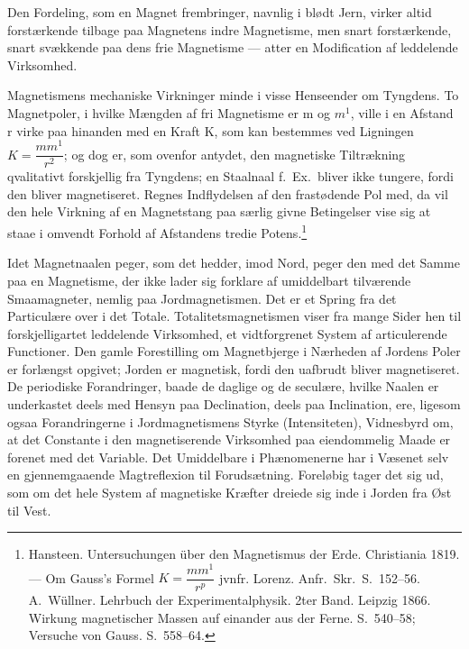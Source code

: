 \documentclass[12pt,a4paper]{book}
\begin{document}
Den Fordeling, som en Magnet frembringer, navnlig i blødt Jern, virker
altid forstærkende tilbage paa Magnetens indre Magnetisme, men snart
forstærkende, snart svækkende paa dens frie Magnetisme --- atter en
Modification af leddelende Virksomhed.

Magnetismens mechaniske Virkninger minde i visse Henseender om
Tyngdens. To Magnetpoler, i hvilke Mængden af fri Magnetisme er m og
$m^{1}$, ville i en Afstand r virke paa hinanden med en Kraft K, som
kan bestemmes ved Ligningen $K = \dfrac{mm^{1}}{r^{2}}$; og dog er,
som ovenfor antydet, den magnetiske Tiltrækning qvalitativt
forskjellig fra Tyngdens; en Staalnaal f.\ Ex.\ bliver ikke tungere,
fordi den bliver magnetiseret. Regnes Indflydelsen af den frastødende
Pol med, da vil den hele Virkning af en Magnetstang paa
særlig givne Betingelser vise sig at staae i omvendt Forhold af
Afstandens tredie Potens.\footnote{%
Hansteen. Untersuchungen über den Magnetismus der Erde. Christiania
1819. --- Om Gauss's Formel $K = \dfrac{mm^{1}}{r^{p}}$ jvnfr.
Lorenz. Anfr.\ Skr.\ S.\ 152--56. A.\ Wüllner. Lehrbuch der
Experimentalphysik. 2ter Band. Leipzig 1866. Wirkung magnetischer
Massen auf einander aus der Ferne. S.\ 540--58; Versuche von Gauss.
S.\ 558--64.}

Idet Magnetnaalen peger, som det hedder, imod Nord, peger den med det
Samme paa en Magnetisme, der ikke lader sig forklare af umiddelbart
tilværende Smaamagneter, nemlig paa Jordmagnetismen. Det er et Spring
fra det Particulære over i det Totale. Totalitetsmagnetismen viser fra
mange Sider hen til forskjelligartet leddelende Virksomhed, et
vidtforgrenet System af articulerende Functioner. Den gamle
Forestilling om Magnetbjerge i Nærheden af Jordens Poler er forlængst
opgivet; Jorden er magnetisk, fordi den uafbrudt bliver magnetiseret.
De periodiske Forandringer, baade de daglige og de seculære, hvilke
Naalen er underkastet deels med Hensyn paa Declination, deels paa
Inclination, ere, ligesom ogsaa Forandringerne i Jordmagnetismens
Styrke (Intensiteten), Vidnesbyrd om, at det Constante i den
magnetiserende Virksomhed paa eiendommelig Maade er forenet med det
Variable. Det Umiddelbare i Phænomenerne har i Væsenet selv en
gjennemgaaende Magtreflexion til Forudsætning. Foreløbig tager det sig
ud, som om det hele System af magnetiske Kræfter dreiede sig inde i
Jorden fra Øst til Vest.
\end{document}
